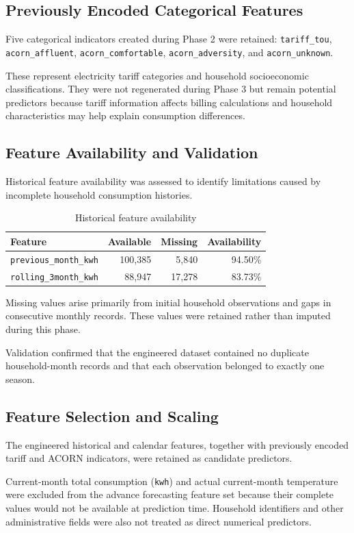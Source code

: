 \documentclass[11pt,a4paper]{article}
\begin{document}
\subsection{Previously Encoded Categorical Features}
Five categorical indicators created during Phase 2 were retained: \texttt{tariff\_tou}, \texttt{acorn\_affluent}, \texttt{acorn\_comfortable}, \texttt{acorn\_adversity}, and \texttt{acorn\_unknown}.

These represent electricity tariff categories and household socioeconomic classifications. They were not regenerated during Phase 3 but remain potential predictors because tariff information affects billing calculations and household characteristics may help explain consumption differences.
\subsection{Feature Availability and Validation}
Historical feature availability was assessed to identify limitations caused by incomplete household consumption histories.
\begin{table}[H]\centering\caption{Historical feature availability}\small
\begin{tabular}{@{}lrrr@{}}\toprule
Feature & Available & Missing & Availability\\\midrule
\texttt{previous\_month\_kwh} & 100,385 & 5,840 & 94.50\%\\
\texttt{rolling\_3month\_kwh} & 88,947 & 17,278 & 83.73\%\\\bottomrule
\end{tabular}\end{table}
Missing values arise primarily from initial household observations and gaps in consecutive monthly records. These values were retained rather than imputed during this phase.

Validation confirmed that the engineered dataset contained no duplicate household-month records and that each observation belonged to exactly one season.
\subsection{Feature Selection and Scaling}
The engineered historical and calendar features, together with previously encoded tariff and ACORN indicators, were retained as candidate predictors.

Current-month total consumption (\texttt{kwh}) and actual current-month temperature were excluded from the advance forecasting feature set because their complete values would not be available at prediction time. Household identifiers and other administrative fields were also not treated as direct numerical predictors.
\end{document}
